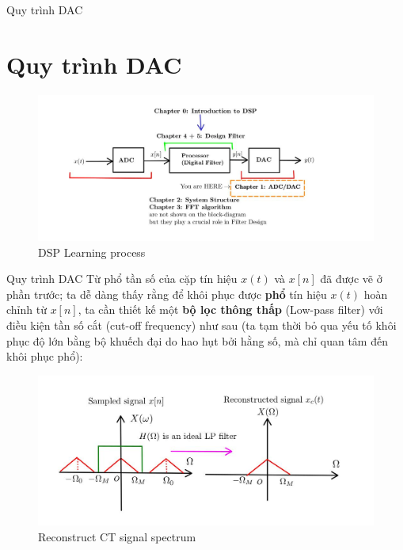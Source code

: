 \documentclass[8pt]{beamer}
\begin{document}
\begin{frame}{Quy trình DAC}
	\section{Quy trình DAC}
\begin{figure}[h]
			\includegraphics[width=1.1\textwidth]{7.jpg}
			\caption{DSP Learning process}			\label{fig:re8}
		\end{figure}

\end{frame}
\begin{frame}{Quy trình DAC}
	Từ phổ tần số của cặp tín hiệu $x(t)$ và $x[n]$ đã được vẽ ở phần trước; ta dễ dàng thấy rằng để khôi phục được \textbf{phổ} tín hiệu $x(t)$ hoàn chỉnh từ $x[n]$, ta cần thiết kế một \textbf{bộ lọc thông thấp} (Low-pass filter) với điều kiện tần số cắt (cut-off frequency) như sau (ta tạm thời bỏ qua yếu tố khôi phục độ lớn bằng bộ khuếch đại do hao hụt bởi hằng số, mà chỉ quan tâm đến khôi phục phổ):
\begin{figure}[h]
			\includegraphics[width=1.1\textwidth]{8.jpg}
			\caption{Reconstruct CT signal spectrum}			\label{fig:re9}
		\end{figure}


\end{frame}
\end{document}
